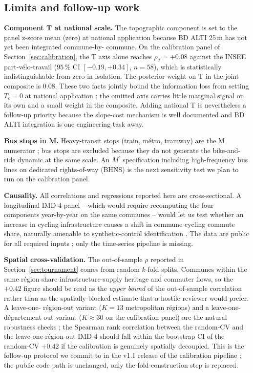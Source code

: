 \documentclass[11pt,a4paper]{article}
\begin{document}
\subsection{Limits and follow-up work}

\textbf{Component T at national scale.}  The topographic component
is set to the panel z-score mean (zero) at national application
because BD ALTI 25\,m has not yet been integrated commune-by-
commune.  On the calibration panel of
Section~\ref{sec:calibration}, the T axis alone reaches
$\rho_{T} = +0.08$ against the INSEE part-v\'elo-travail
($95\,\%$ CI $[-0.19, +0.34]$, $n = 58$), which is statistically
indistinguishable from zero in isolation.  The posterior weight
on T in the joint composite is $0.08$.  These two facts jointly
bound the information loss from setting $T_c = 0$ at national
application : the omitted axis carries little marginal signal on
its own and a small weight in the composite.  Adding national T
is nevertheless a follow-up priority because the slope-cost
mechanism is well documented \citep{Parkin2008,Rietveld2004}
and BD ALTI integration is one engineering task away.

\textbf{Bus stops in M.}  Heavy-transit stops (train, m\'etro,
tramway) are the M numerator ; bus stops are excluded because they
do not generate the bike-and-ride dynamic at the same scale.  An
$M^{\prime}$ specification including high-frequency bus lines on
dedicated rights-of-way (BHNS) is the next sensitivity test we
plan to run on the calibration panel.

\textbf{Causality.}  All correlations and regressions reported here
are cross-sectional.  A longitudinal IMD-4 panel -- which would
require recomputing the four components year-by-year on the same
communes -- would let us test whether an increase in cycling
infrastructure causes a shift in commune cycling commute share,
naturally amenable to synthetic-control identification
\citep{Abadie2010,Abadie2021}.  The data are public for all
required inputs ; only the time-series pipeline is missing.

\textbf{Spatial cross-validation.}  The out-of-sample $\rho$
reported in Section~\ref{sec:tournament} comes from random
$k$-fold splits.  Communes within the same r\'egion share
infrastructure-supply heritage and commuter flows, so the
$+0.42$ figure should be read as the \emph{upper bound} of the
out-of-sample correlation rather than as the spatially-blocked
estimate that a hostile reviewer would prefer.  A leave-one-
r\'egion-out variant ($K = 13$ metropolitan r\'egions) and a
leave-one-d\'epartement-out variant ($K \approx 30$ on the
calibration panel) \citep{Roberts2017,Pohjankukka2017} are the
natural robustness checks ; the Spearman rank correlation
between the random-CV and the leave-one-r\'egion-out IMD-4
should fall within the bootstrap CI of the random-CV $+0.42$ if
the calibration is genuinely spatially decoupled.  This is the
follow-up protocol we commit to in the v1.1 release of the
calibration pipeline ; the public code path is unchanged, only
the fold-construction step is replaced.
\end{document}
